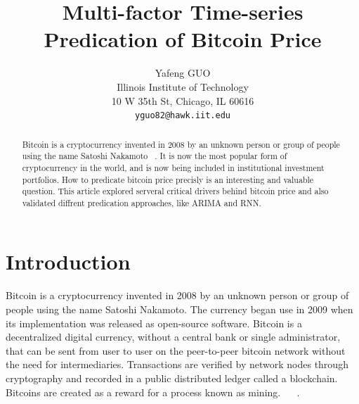 \documentclass[10pt,twocolumn,letterpaper]{article}
\begin{document}
\title{Multi-factor Time-series Predication of Bitcoin Price}

\author{Yafeng GUO\\
Illinois Institute of Technology\\
10 W 35th St, Chicago, IL 60616\\
{\tt\small yguo82@hawk.iit.edu}
}

\maketitle

\begin{abstract}
   Bitcoin is a cryptocurrency invented in 2008 by an unknown person or group of people using the name Satoshi Nakamoto ~\cite{Authors03}. 
   It is now the most popular form of cryptocurrency in the world, and is now being included in institutional investment 
   portfolios. How to predicate bitcoin price precisly is an interesting and valuable question. This article explored serveral 
   critical drivers behind bitcoin price and also validated diffrent predication approaches, like ARIMA and RNN.
\end{abstract}

\section{Introduction}
Bitcoin is a cryptocurrency invented in 2008 by an unknown person or group of people using the name Satoshi Nakamoto. The currency began 
use in 2009 when its implementation was released as open-source software. Bitcoin is a decentralized digital currency, without a central 
bank or single administrator, that can be sent from user to user on the peer-to-peer bitcoin network without the need for intermediaries.
Transactions are verified by network nodes through cryptography and recorded in a public distributed ledger called a blockchain. Bitcoins 
are created as a reward for a process known as mining. ~\cite{Authors03} ~\cite{Authors04}. 
\end{document}
